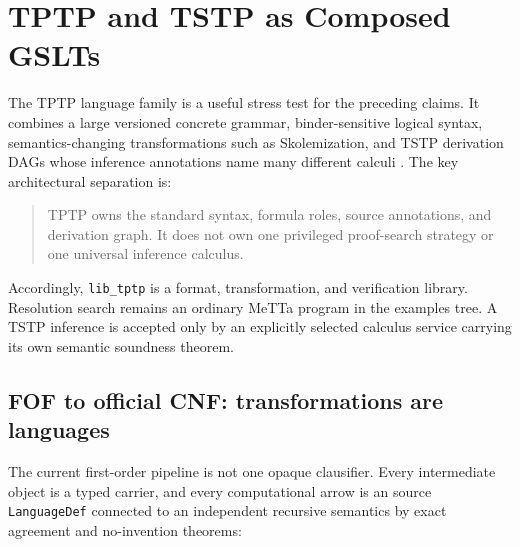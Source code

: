 \documentclass[11pt]{article}
\newcommand{\code}[1]{\texttt{#1}}
\begin{document}
\section{TPTP and TSTP as Composed GSLTs}
\label{sec:tptp-gslt}

The TPTP language family is a useful stress test for the preceding claims.
It combines a large versioned concrete grammar, binder-sensitive logical
syntax, semantics-changing transformations such as Skolemization, and TSTP
derivation DAGs whose inference annotations name many different calculi
\cite{tptp-language,tstp-derivations}.  The key architectural separation is:

\begin{quote}
TPTP owns the standard syntax, formula roles, source annotations, and
derivation graph.  It does not own one privileged proof-search strategy or
one universal inference calculus.
\end{quote}

Accordingly, \code{lib\_tptp} is a format, transformation, and verification
library.  Resolution search remains an ordinary MeTTa program in the
examples tree.  A TSTP inference is accepted only by an explicitly selected
calculus service carrying its own semantic soundness theorem.

\subsection{FOF to official CNF: transformations are languages}

The current first-order pipeline is not one opaque clausifier.  Every
intermediate object is a typed carrier, and every computational arrow is an
source \code{LanguageDef} connected to an independent recursive semantics
by exact agreement and no-invention theorems:
\end{document}
